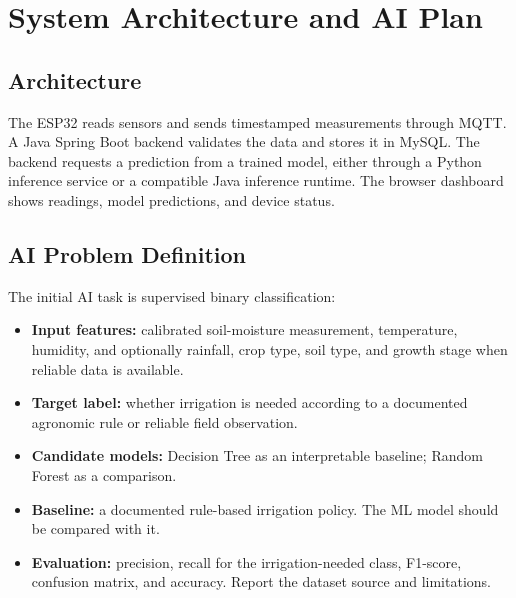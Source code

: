 \documentclass[12pt,a4paper]{report}
\begin{document}
\chapter{System Architecture and AI Plan}
\section{Architecture}
The ESP32 reads sensors and sends timestamped measurements through MQTT. A Java Spring Boot backend validates the data and stores it in MySQL. The backend requests a prediction from a trained model, either through a Python inference service or a compatible Java inference runtime. The browser dashboard shows readings, model predictions, and device status.

\section{AI Problem Definition}
The initial AI task is supervised binary classification:
\begin{itemize}[leftmargin=*]
\item \textbf{Input features:} calibrated soil-moisture measurement, temperature, humidity, and optionally rainfall, crop type, soil type, and growth stage when reliable data is available.
\item \textbf{Target label:} whether irrigation is needed according to a documented agronomic rule or reliable field observation.
\item \textbf{Candidate models:} Decision Tree as an interpretable baseline; Random Forest as a comparison.
\item \textbf{Baseline:} a documented rule-based irrigation policy. The ML model should be compared with it.
\item \textbf{Evaluation:} precision, recall for the irrigation-needed class, F1-score, confusion matrix, and accuracy. Report the dataset source and limitations.
\end{itemize}
\end{document}
